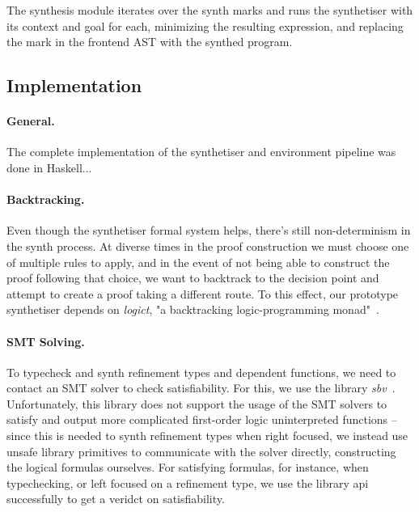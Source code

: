 \documentclass{llncs}
\newcommand{\mypara}[1]{\paragraph{\textbf{#1}.}}
\begin{document}
The synthesis module iterates over the synth marks and runs the synthetiser with
its context and goal for each, minimizing the resulting expression, and
replacing the mark in the frontend AST with the synthed program.


\subsection{Implementation}

\mypara{General} The complete implementation of the synthetiser and environment
pipeline was done in Haskell...

\mypara{Backtracking} Even though the synthetiser formal system helps, there's
still non-determinism in the synth process. At diverse times in the proof
construction we must choose one of multiple rules to apply, and in the event of
not being able to construct the proof following that choice, we want to
backtrack to the decision point and attempt to create a proof taking a different
route. To this effect, our prototype synthetiser depends on \emph{logict}, "a backtracking logic-programming
monad"~\cite{logict}.

\mypara{SMT Solving} To typecheck and synth refinement types and dependent
functions, we need to contact an SMT solver to check satisfiability. For this,
we use the library \emph{sbv}~\cite{sbv}. Unfortunately, this library does not
support the usage of the SMT solvers to satisfy and output more complicated
first-order logic uninterpreted functions -- since this is needed to synth refinement types
when right focused, we instead use unsafe library primitives to communicate with
the solver directly, constructing the logical formulas ourselves. For 
satisfying formulas, for instance, when typechecking, or left focused on a
refinement type, we use the library api successfully to get a veridct on
satisfiability.
\end{document}
